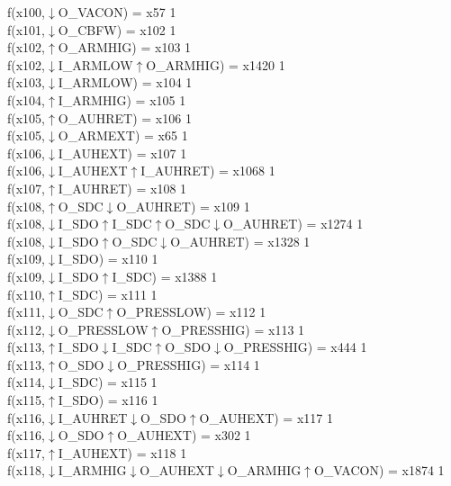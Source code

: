 f(x100,$\downarrow$O\_VACON) = x57 {1} \\
f(x101,$\downarrow$O\_CBFW) = x102 {1} \\
f(x102,$\uparrow$O\_ARMHIG) = x103 {1} \\
f(x102,$\downarrow$I\_ARMLOW$\uparrow$O\_ARMHIG) = x1420 {1} \\
f(x103,$\downarrow$I\_ARMLOW) = x104 {1} \\
f(x104,$\uparrow$I\_ARMHIG) = x105 {1} \\
f(x105,$\uparrow$O\_AUHRET) = x106 {1} \\
f(x105,$\downarrow$O\_ARMEXT) = x65 {1} \\
f(x106,$\downarrow$I\_AUHEXT) = x107 {1} \\
f(x106,$\downarrow$I\_AUHEXT$\uparrow$I\_AUHRET) = x1068 {1} \\
f(x107,$\uparrow$I\_AUHRET) = x108 {1} \\
f(x108,$\uparrow$O\_SDC$\downarrow$O\_AUHRET) = x109 {1} \\
f(x108,$\downarrow$I\_SDO$\uparrow$I\_SDC$\uparrow$O\_SDC$\downarrow$O\_AUHRET) = x1274 {1} \\
f(x108,$\downarrow$I\_SDO$\uparrow$O\_SDC$\downarrow$O\_AUHRET) = x1328 {1} \\
f(x109,$\downarrow$I\_SDO) = x110 {1} \\
f(x109,$\downarrow$I\_SDO$\uparrow$I\_SDC) = x1388 {1} \\
f(x110,$\uparrow$I\_SDC) = x111 {1} \\
f(x111,$\downarrow$O\_SDC$\uparrow$O\_PRESSLOW) = x112 {1} \\
f(x112,$\downarrow$O\_PRESSLOW$\uparrow$O\_PRESSHIG) = x113 {1} \\
f(x113,$\uparrow$I\_SDO$\downarrow$I\_SDC$\uparrow$O\_SDO$\downarrow$O\_PRESSHIG) = x444 {1} \\
f(x113,$\uparrow$O\_SDO$\downarrow$O\_PRESSHIG) = x114 {1} \\
f(x114,$\downarrow$I\_SDC) = x115 {1} \\
f(x115,$\uparrow$I\_SDO) = x116 {1} \\
f(x116,$\downarrow$I\_AUHRET$\downarrow$O\_SDO$\uparrow$O\_AUHEXT) = x117 {1} \\
f(x116,$\downarrow$O\_SDO$\uparrow$O\_AUHEXT) = x302 {1} \\
f(x117,$\uparrow$I\_AUHEXT) = x118 {1} \\
f(x118,$\downarrow$I\_ARMHIG$\downarrow$O\_AUHEXT$\downarrow$O\_ARMHIG$\uparrow$O\_VACON) = x1874 {1} \\
